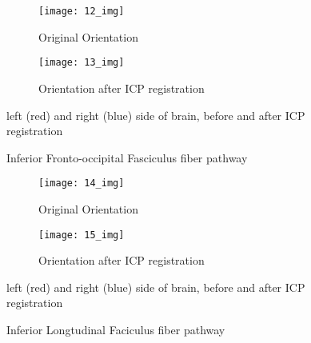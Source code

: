 \documentclass[../structure.tex]{subfiles}
\begin{document}
\begin{figure}[H]
	\centering
	\begin{subfigure}[b]{0.49\textwidth}
	\centering
	\texttt{[image: 12\_img]}
	\caption{Original Orientation}
	\end{subfigure}
	\begin{subfigure}[b]{0.49\textwidth}
	\centering
	\texttt{[image: 13\_img]}
	\caption{Orientation after ICP registration}
	\end{subfigure}
\captionsetup{justification=centering}
\caption{Inferior Fronto-occipital Fasciculus fiber pathway}{ left (red) and right (blue) side of brain, before and after ICP registration}
\label{fig:pca}
\end{figure}

\begin{figure}[H]
	\centering
	\begin{subfigure}[b]{0.49\textwidth}
	\centering
	\texttt{[image: 14\_img]}
	\caption{Original Orientation}
	\end{subfigure}
	\begin{subfigure}[b]{0.49\textwidth}
	\centering
	\texttt{[image: 15\_img]}
	\caption{Orientation after ICP registration}
	\end{subfigure}
\captionsetup{justification=centering}
\caption{Inferior Longtudinal Faciculus fiber pathway}{ left (red) and right (blue) side of brain, before and after ICP registration}
\label{fig:pca}
\end{figure}

\end{document}
